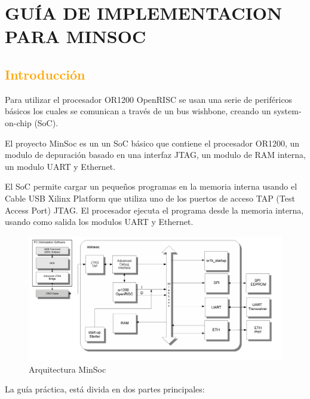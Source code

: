 
\chapter{GUÍA DE IMPLEMENTACION PARA MINSOC}


	\section{\textcolor{orange}{Introducción}}

Para utilizar el procesador OR1200 OpenRISC se usan una serie de periféricos básicos los cuales se comunican a través de un bus wishbone, creando un system-on-chip (SoC). 

El proyecto MinSoc es un un SoC básico que  contiene el procesador OR1200, un modulo de depuración basado en una interfaz JTAG, un modulo de RAM  interna, un modulo UART y Ethernet.

El SoC permite cargar un pequeños programas en la memoria interna usando el Cable USB  Xilinx Platform que utiliza uno de los puertos de acceso TAP (Test Access Port) JTAG. El procesador ejecuta el programa desde la memoria interna, usando como salida los modulos UART y Ethernet. 

\begin{figure}[h!]
 \begin{center}
  \includegraphics[width=1\textwidth,keepaspectratio=true]{./images/minsoc}
  \caption{Arquitectura MinSoc}
  \label{fig:esquema}
 \end{center}
\end{figure}

La guía práctica, está divida en dos partes principales: 

